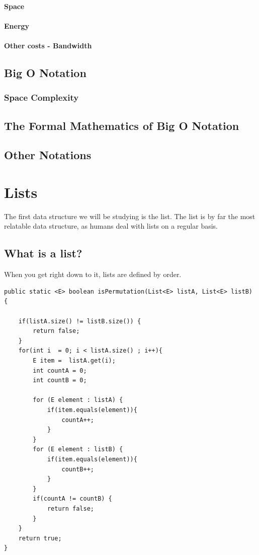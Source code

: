 \documentclass[10pt,a4paper]{book}
\begin{document}
\subsubsection{Space}
\subsubsection{Energy}
\subsubsection{Other costs - Bandwidth}

\section{Big O Notation}
\subsection{Space Complexity}

\section{The Formal Mathematics of Big O Notation}
\section{Other Notations}

\chapter{Lists}
The first data structure we will be studying is the list.
The list is by far the most relatable data structure, as humans deal with lists on a regular basis.

\section{What is a list?}
When you get right down to it, lists are defined by order.


\begin{verbatim}
public static <E> boolean isPermutation(List<E> listA, List<E> listB) {
	
	if(listA.size() != listB.size()) {
		return false;
	}
	for(int i  = 0; i < listA.size() ; i++){
		E item =  listA.get(i);
		int countA = 0;
		int countB = 0;
		
		for (E element : listA) {
			if(item.equals(element)){
				countA++;
			}
		}
		for (E element : listB) {
			if(item.equals(element)){
				countB++;
			}
		}
		if(countA != countB) {
			return false;
		}
	}
	return true;
}
\end{verbatim}
\end{document}

